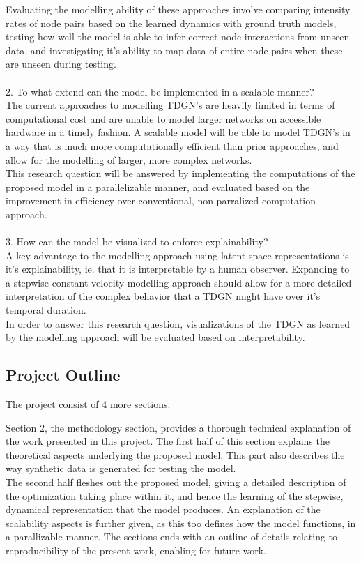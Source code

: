 Evaluating the modelling ability of these approaches involve comparing intensity rates of node pairs based on the learned dynamics with ground truth models, testing how well the model is able to infer correct node interactions from unseen data, and investigating it's ability to map data of entire node pairs when these are unseen during testing.
\\\\
\hspace*{5mm} 2. To what extend can the model be implemented in a scalable manner?
\\
The current approaches to modelling TDGN's are heavily limited in terms of computational cost and are unable to model larger networks on accessible hardware in a timely fashion.
A scalable model will be able to model TDGN's in a way that is much more computationally efficient than prior approaches, and allow for the modelling of larger, more complex networks.
\\
This research question will be answered by implementing the computations of the proposed model in a parallelizable manner, and evaluated based on the improvement in efficiency over conventional, non-parralized computation approach.
\\\\
\hspace*{5mm} 3. How can the model be visualized to enforce explainability?
\\
A key advantage to the modelling approach using latent space representations is it's explainability, ie. that it is interpretable by a human observer.
Expanding to a stepwise constant velocity modelling approach should allow for a more detailed interpretation of the complex behavior that a TDGN might have over it's temporal duration.
\\
In order to answer this research question, visualizations of the TDGN as learned by the modelling approach will be evaluated based on interpretability. 



\subsection{Project Outline}
\label{sec:Intro:ThesisOutline}
The project consist of 4 more sections.

Section 2, the methodology section, provides a thorough technical explanation of the work presented in this project.
The first half of this section explains the theoretical aspects underlying the proposed model.
This part also describes the way synthetic data is generated for testing the model.
\\
The second half fleshes out the proposed model, giving a detailed description of the optimization taking place within it, and hence the learning of the stepwise, dynamical representation that the model produces.
An explanation of the scalability aspects is further given, as this too defines how the model functions, in a parallizable manner.
The sections ends with an outline of details relating to reproducibility of the present work, enabling for future work.

